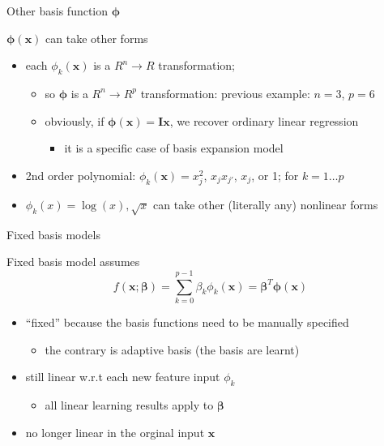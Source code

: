 \documentclass[ignorenonframetext,aspectratio=169]{beamer}
\providecommand{\tightlist}{%
  \setlength{\itemsep}{0pt}\setlength{\parskip}{0pt}}
\newcommand{\vv}[1]{\boldsymbol{#1}}
\begin{document}
\begin{frame}{Other basis function \(\vv{\phi}\)}
\protect\hypertarget{other-basis-function-vvphi}{}

\(\vv{\phi}{(\vv{x})}\) can take other forms

\begin{itemize}
\tightlist
\item
  each \(\phi_k(\vv{x})\) is a \(R^n\rightarrow R\) transformation;

  \begin{itemize}
  \tightlist
  \item
    so \(\vv{\phi}\) is a \(R^n\rightarrow R^p\) transformation:
    previous example: \(n=3\), \(p=6\)
  \item
    obviously, if \(\vv{\phi}(\vv{x}) = \vv{I}\vv{x}\), we recover
    ordinary linear regression

    \begin{itemize}
    \tightlist
    \item
      it is a specific case of basis expansion model
    \end{itemize}
  \end{itemize}
\item
  2nd order polynomial: \(\phi_k(\vv{x}) = x_j^2\), \(x_jx_{j'}\),
  \(x_j\), or 1; for \(k=1\ldots p\) 
\item
  \(\phi_k(x) = \log(x), \sqrt{x}\) can take other (literally any)
  nonlinear forms
\end{itemize}

\end{frame}

\begin{frame}{Fixed basis models}
\protect\hypertarget{fixed-basis-models}{}

Fixed basis model assumes
\[f(\vv{x};\vv{\beta})=\sum_{k=0}^{p-1} {\beta}_k {\phi}_k(\vv{x})= \vv{\beta}^T\vv{\phi}(\vv{x})\]

\begin{itemize}
\tightlist
\item
  ``fixed'' because the basis functions need to be manually specified

  \begin{itemize}
  \tightlist
  \item
    the contrary is adaptive basis (the basis are learnt)
  \end{itemize}
\item
  still linear w.r.t each new feature input \(\phi_k\)

  \begin{itemize}
  \tightlist
  \item
    all linear learning results apply to \(\vv{\beta}\)
  \end{itemize}
\item
  no longer linear in the orginal input \(\vv{x}\)
\end{itemize}

\end{frame}
\end{document}

